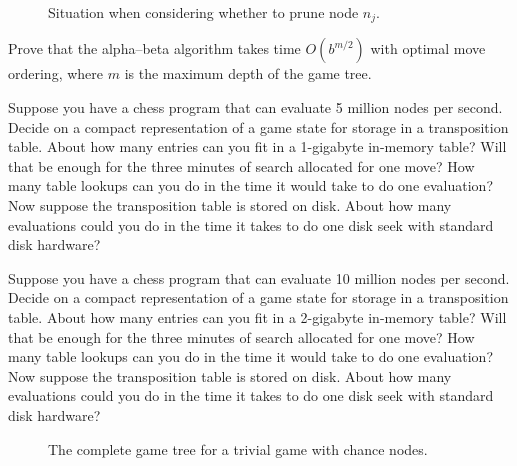 \begin{figure}[btp]
\caption{Situation when considering whether to prune node \(n_j\).}
\label{alpha-beta-proof-figure}
\end{figure} 

\begin{exercise}%
Prove that the alpha--beta algorithm takes time \(O(b^{m/2})\) with optimal 
move ordering, where \(m\) is the maximum depth of the game tree. 
\end{exercise} 



\begin{iexercise}
Suppose you have a chess program that can evaluate 5 million nodes
per second. Decide on a compact representation of a game
state for storage in a transposition table.  About how many entries can
you fit in a 1-gigabyte in-memory table? Will that be enough for the three minutes
of search allocated for one move? How many table lookups can you do in 
the time it would take to do one evaluation?  Now suppose the
transposition table is stored on disk. About how many
evaluations could you do in the time it takes to do one disk seek
with standard disk hardware?
\end{iexercise} 

\begin{uexercise}
Suppose you have a chess program that can evaluate 10 million nodes
per second. Decide on a compact representation of a game
state for storage in a transposition table.  About how many entries can
you fit in a 2-gigabyte in-memory table? Will that be enough for the three minutes
of search allocated for one move? How many table lookups can you do in 
the time it would take to do one evaluation?  Now suppose the
transposition table is stored on disk. About how many
evaluations could you do in the time it takes to do one disk seek
with standard disk hardware?
\end{uexercise} 



\begin{figure}[tbp]
\caption{The complete game tree for a trivial game with chance nodes.}
\label{trivial-chance-game-figure}
\end{figure} 

